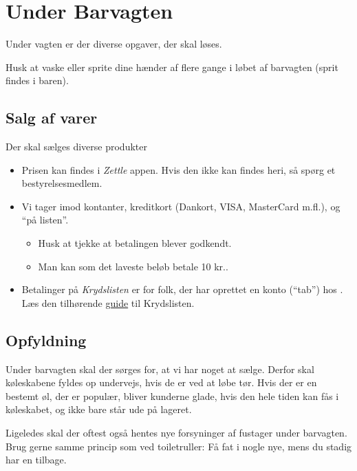 \section{Under Barvagten}
\label{sec:intra-barvagten}

Under vagten er der diverse opgaver, der skal løses.

Husk at vaske eller sprite dine hænder af flere gange i løbet af barvagten
(sprit findes i baren).

\subsection{Salg af varer}
\label{sec:intra:salg}

Der skal sælges diverse produkter
\begin{itemize}
    \item Prisen kan findes i \textit{Zettle} appen. Hvis den ikke kan findes heri, så spørg et bestyrelsesmedlem.
    \item Vi tager imod kontanter, kreditkort (Dankort, VISA, MasterCard
    m.fl.), og ``på listen''.
    \begin{itemize}
        \item Husk at tjekke at betalingen blever godkendt.
        \item Man kan som det laveste beløb betale 10 kr..
    \end{itemize}
    \item Betalinger på \textit{Krydslisten} er for folk, der har oprettet en konto
    (``tab'') hos \fredagscafeen. Læs den tilhørende \href{https://media.fredagscafeen.dk/guides/krydsliste.pdf}{guide} til Krydslisten.
\end{itemize}

\subsection{Opfyldning}
\label{sec:intra:opfyldning}

Under barvagten skal der sørges for, at vi har noget at sælge. Derfor skal
køleskabene fyldes op undervejs, hvis de er ved at løbe tør. Hvis der
er en bestemt øl, der er populær, bliver kunderne glade, hvis den hele
tiden kan fås i køleskabet, og ikke bare står ude på lageret.

Ligeledes skal der oftest også hentes nye forsyninger af fustager
under barvagten. Brug gerne samme princip som ved toiletruller: Få fat
i nogle nye, mens du stadig har en tilbage.

